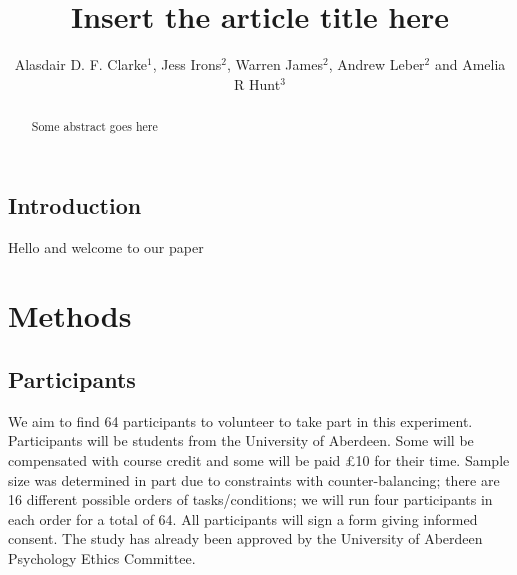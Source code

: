 \documentclass[]{rsos}%
\begin{document}
\linenumbers
\title{Insert the article title here}

\author{%
Alasdair D. F. Clarke$^1$, Jess Irons$^2$, Warren James$^2$, Andrew Leber$^2$ and Amelia R Hunt$^3$}

\address{
$^{1}$Department of Psychology, University of Essex, Colchester, UK\\
$^{2}$Department of Psychology, The Ohio State Universoty, Columbus, USA\\
$^{3}$School of Psychology, University of Aberdeen, Aberdeen, UK
}

\subject{Behaviour, evolution}



\begin{abstract}
Some abstract goes here
\end{abstract}


\begin{fmtext}
\section{Introduction}
Hello and welcome to our paper
\end{fmtext}

\maketitle


\section{Methods}


\subsection{Participants}
We aim to find 64 participants to volunteer to take part in this experiment. Participants will be students from the University of Aberdeen. Some will be compensated with course credit and some will be paid \pounds 10 for their time. Sample size was determined in part due to constraints with counter-balancing; there are 16 different possible orders of tasks/conditions; we will run four participants in each order for a total of 64. All participants will sign a form giving informed consent. The study has already been approved by the University of Aberdeen Psychology Ethics Committee.
\end{document}
